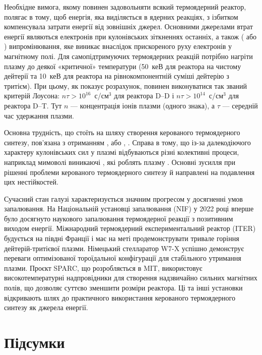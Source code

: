 Необхідне вимога, якому повинен задовольняти всякий термоядерний реактор, полягає в тому, щоб енергія, яка виділяється в ядерних реакціях, з ізбитком компенсувала затрати енергії від зовнішніх джерел. Основними джерелами втрат енергії являються  електронів при кулонівських зіткненнях останніх, а також  ( або ) випромінювання, яке виникає внаслідок прискореного руху електронів у магнітному полі. Для самопідтримуючих термоядерних реакцій потрібно нагріти плазму до деякої «критичної» температури (50~кеВ для реактора на чистому дейтерії та 10~кеВ для реактора на рівнокомпонентній суміші дейтерію з тритієм). При цьому, як показує розрахунок, повинен виконуватися так званий критерій Лоусона: $n\tau > 10^{16}$~с/см$^3$ для реактора D--D і $n\tau > 10^{14}$~с/см$^3$ для реактора D--T. Тут $n$ --- концентрація іонів плазми (одного знака), а $\tau$ --- середній час удержання плазми.

Основна трудність, що стоїть на шляху створення керованого термоядерного синтезу, пов'язана з отриманням , або , . Справа в тому, що із-за далекодіючого характеру кулонівських сил у плазмі відбуваються різні колективні процеси, наприклад мимоволі виникаючі , які роблять плазму . Основні зусилля при рішенні проблеми керованого термоядерного синтезу й направлені на подавлення цих нестійкостей.

Сучасний стан галузі характеризується значним прогресом у досягненні умов запалювання. На Національній установці запалювання (NIF) у 2022 році вперше було досягнуто наукового запалювання термоядерної реакції з позитивним виходом енергії. Міжнародний термоядерний експериментальний реактор (ITER) будується на півдні Франції і має на меті продемонструвати тривале горіння дейтерій-тритієвої плазми. Німецький стелларатор W7-X успішно демонструє переваги оптимізованої тороїдальної конфігурації для стабільного утримання плазми. Проєкт SPARC, що розробляється в MIT, використовує високотемпературні надпровідники для створення надзвичайно сильних магнітних полів, що дозволяє суттєво зменшити розміри реактора. Ці та інші установки відкривають шлях до практичного використання керованого термоядерного синтезу як джерела енергії.

\section*{Підсумки}

